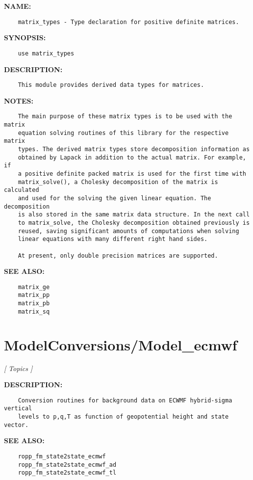 \label{ch:robo56}
\label{ch:Matrices_matrix_types}
\textbf{NAME:}\hspace{0.08in}\begin{Verbatim}
    matrix_types - Type declaration for positive definite matrices.
\end{Verbatim}
\textbf{SYNOPSIS:}\hspace{0.08in}\begin{Verbatim}
    use matrix_types
\end{Verbatim}
\textbf{DESCRIPTION:}\hspace{0.08in}\begin{Verbatim}
    This module provides derived data types for matrices.
\end{Verbatim}
\textbf{NOTES:}\hspace{0.08in}\begin{Verbatim}
    The main purpose of these matrix types is to be used with the matrix 
    equation solving routines of this library for the respective matrix
    types. The derived matrix types store decomposition information as
    obtained by Lapack in addition to the actual matrix. For example, if
    a positive definite packed matrix is used for the first time with
    matrix_solve(), a Cholesky decomposition of the matrix is calculated
    and used for the solving the given linear equation. The decomposition
    is also stored in the same matrix data structure. In the next call
    to matrix_solve, the Cholesky decomposition obtained previously is
    reused, saving significant amounts of computations when solving
    linear equations with many different right hand sides.

    At present, only double precision matrices are supported. 
\end{Verbatim}
\textbf{SEE ALSO:}\hspace{0.08in}\begin{Verbatim}
    matrix_ge
    matrix_pp
    matrix_pb
    matrix_sq
\end{Verbatim}
\section{ModelConversions/Model\_ecmwf}
\textsl{[ Topics ]}

\label{ch:robo64}
\label{ch:ModelConversions_Model_ecmwf}
\textbf{DESCRIPTION:}\hspace{0.08in}\begin{Verbatim}
    Conversion routines for background data on ECWMF hybrid-sigma vertical
    levels to p,q,T as function of geopotential height and state vector.
\end{Verbatim}
\textbf{SEE ALSO:}\hspace{0.08in}\begin{Verbatim}
    ropp_fm_state2state_ecmwf
    ropp_fm_state2state_ecmwf_ad
    ropp_fm_state2state_ecmwf_tl
\end{Verbatim}
